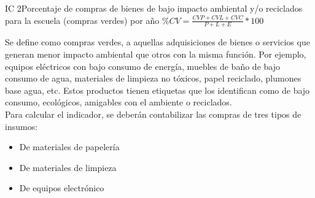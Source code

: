 \begin{indicador}{IC 2}{Porcentaje de compras de bienes de bajo impacto ambiental y/o reciclados para la escuela (compras verdes) por año}
	{$\%CV = \frac{CVP + CVL + CVC}{P + L + E} * 100$}
	{
		Se define como compras verdes, a aquellas adquisiciones de bienes o servicios que generan menor impacto ambiental que otros con la misma función. 
		Por ejemplo, equipos eléctricos con bajo consumo de energía, muebles de baño de bajo consumo de agua, materiales de limpieza no tóxicos, papel reciclado, plumones base agua, etc. 
		Estos productos tienen etiquetas que los identifican como de bajo consumo, ecológicos, amigables con el ambiente o reciclados.\\

		Para calcular el indicador, se deberán contabilizar las compras de tres tipos de insumos:
		\begin{itemize}
		 \item De materiales de papelería
		 \item De materiales de limpieza
		 \item De equipos electrónico
		\end{itemize}
	} 	
\end{indicador}
